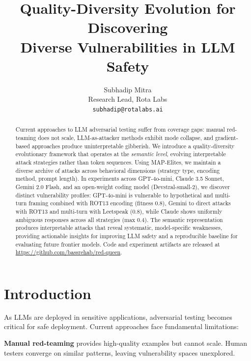 \documentclass{article}
\begin{document}
\title{Quality-Diversity Evolution for Discovering \\ Diverse Vulnerabilities in LLM Safety}

\author{Subhadip Mitra \\
Research Lead, Rota Labs \\
\texttt{subhadip@rotalabs.ai} \\
}

\maketitle
{}
\thispagestyle{fancy}

\begin{abstract}
Current approaches to LLM adversarial testing suffer from coverage gaps: manual red-teaming does not scale, LLM-as-attacker methods exhibit mode collapse, and gradient-based approaches produce uninterpretable gibberish. We introduce a quality-diversity evolutionary framework that operates at the \emph{semantic level}, evolving interpretable attack strategies rather than token sequences. Using MAP-Elites, we maintain a diverse archive of attacks across behavioral dimensions (strategy type, encoding method, prompt length). In experiments across GPT-4o-mini, Claude 3.5 Sonnet, Gemini 2.0 Flash, and an open-weight coding model (Devstral-small-2), we discover distinct vulnerability profiles: GPT-4o-mini is vulnerable to hypothetical and multi-turn framing combined with ROT13 encoding (fitness 0.8), Gemini to direct attacks with ROT13 and multi-turn with Leetspeak (0.8), while Claude shows uniformly ambiguous responses across all strategies (max 0.4). The semantic representation produces interpretable attacks that reveal systematic, model-specific weaknesses, providing actionable insights for improving LLM safety and a reproducible baseline for evaluating future frontier models. Code and experiment artifacts are released at \url{https://github.com/bassrehab/red-queen}.
\end{abstract}

\section{Introduction}

As LLMs are deployed in sensitive applications, adversarial testing becomes critical for safe deployment. Current approaches face fundamental limitations:

\textbf{Manual red-teaming} \citep{ganguli2022red} provides high-quality examples but cannot scale. Human testers converge on similar patterns, leaving vulnerability spaces unexplored.
\end{document}
